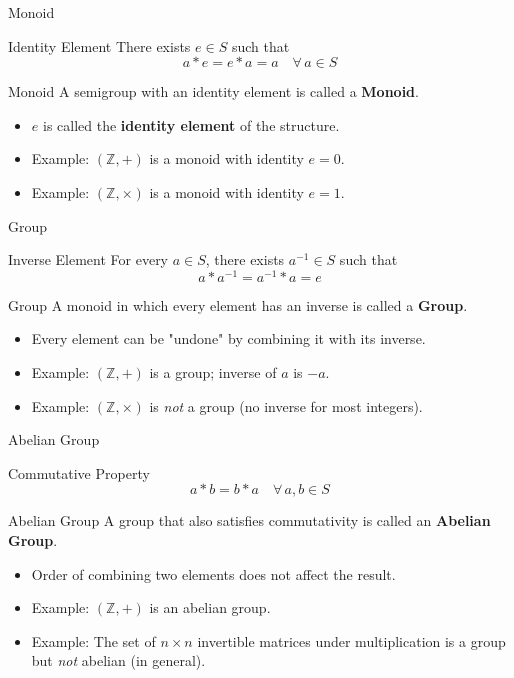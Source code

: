 \documentclass[9pt,aspectratio=169]{beamer}
\begin{document}
\begin{frame}{Monoid}
\begin{block}{Identity Element}
There exists $e \in S$ such that
$$a * e = e * a = a \quad \forall\, a \in S$$
\end{block}
\begin{alertblock}{Monoid}
A semigroup with an identity element is called a \textbf{Monoid}.
\end{alertblock}
\begin{itemize}
\item $e$ is called the \textbf{identity element} of the structure.
\item Example: $(\mathbb{Z}, +)$ is a monoid with identity $e = 0$.
\item Example: $(\mathbb{Z}, \times)$ is a monoid with identity $e = 1$.
\end{itemize}
\end{frame}

\begin{frame}{Group}
\begin{block}{Inverse Element}
For every $a \in S$, there exists $a^{-1} \in S$ such that
$$a * a^{-1} = a^{-1} * a = e$$
\end{block}
\begin{alertblock}{Group}
A monoid in which every element has an inverse is called a \textbf{Group}.
\end{alertblock}
\begin{itemize}
\item Every element can be "undone" by combining it with its inverse.
\item Example: $(\mathbb{Z}, +)$ is a group; inverse of $a$ is $-a$.
\item Example: $(\mathbb{Z}, \times)$ is \emph{not} a group (no inverse for most integers).
\end{itemize}
\end{frame}

\begin{frame}{Abelian Group}
\begin{block}{Commutative Property}
$$a * b = b * a \quad \forall\, a,b \in S$$
\end{block}
\begin{alertblock}{Abelian Group}
A group that also satisfies commutativity is called an \textbf{Abelian Group}.
\end{alertblock}
\begin{itemize}
\item Order of combining two elements does not affect the result.
\item Example: $(\mathbb{Z}, +)$ is an abelian group.
\item Example: The set of $n\times n$ invertible matrices under multiplication is a group but \emph{not} abelian (in general).
\end{itemize}
\end{frame}
\end{document}
